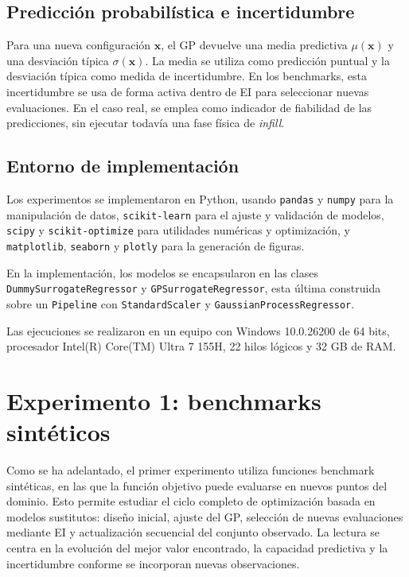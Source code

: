 \subsection{Predicción probabilística e incertidumbre}
\label{subsubsec:prediccion_incertidumbre}

Para una nueva configuración \(\bm{x}\), el GP devuelve una media predictiva \(\mu(\bm{x})\) y una desviación típica \(\sigma(\bm{x})\). La media se utiliza como predicción puntual y la desviación típica como medida de incertidumbre. En los benchmarks, esta incertidumbre se usa de forma activa dentro de EI para seleccionar nuevas evaluaciones. En el caso real, se emplea como indicador de fiabilidad de las predicciones, sin ejecutar todavía una fase física de \emph{infill}.

\subsection{Entorno de implementación}
\label{subsubsec:entorno_implementacion}

Los experimentos se implementaron en Python, usando \texttt{pandas} y \texttt{numpy} para la manipulación de datos, \texttt{scikit-learn} para el ajuste y validación de modelos, \texttt{scipy} y \texttt{scikit-optimize} para utilidades numéricas y optimización, y \texttt{matplotlib}, \texttt{seaborn} y \texttt{plotly} para la generación de figuras. 

En la implementación, los modelos se encapsularon en las clases \texttt{DummySurrogateRegressor} y \texttt{GPSurrogateRegressor}, esta última construida sobre un \texttt{Pipeline} con \texttt{StandardScaler} y \texttt{GaussianProcessRegressor}.

Las ejecuciones se realizaron en un equipo con Windows 10.0.26200 de 64 bits, procesador Intel(R) Core(TM) Ultra 7 155H, 22 hilos lógicos y 32 GB de RAM.

\section{Experimento 1: benchmarks sintéticos}
\label{subsec:experimento_benchmarks}

Como se ha adelantado, el primer experimento utiliza funciones benchmark sintéticas, en las que la función objetivo puede evaluarse en nuevos puntos del dominio. Esto permite estudiar el ciclo completo de optimización basada en modelos sustitutos: diseño inicial, ajuste del GP, selección de nuevas evaluaciones mediante EI y actualización secuencial del conjunto observado. La lectura se centra en la evolución del mejor valor encontrado, la capacidad predictiva y la incertidumbre conforme se incorporan nuevas observaciones.

